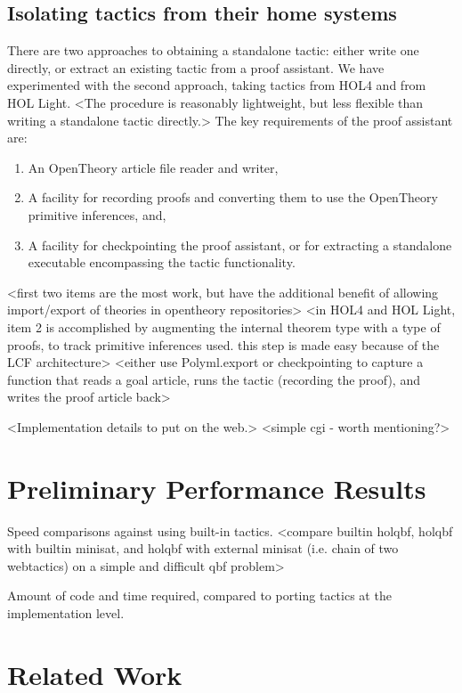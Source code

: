 \documentclass{llncs}
\newcommand{\OpenTheory}{OpenTheory\xspace}
\begin{document}
\subsection{Isolating tactics from their home systems}
There are two approaches to obtaining a standalone tactic: either write one directly, or extract an existing tactic from a proof assistant. 
We have experimented with the second approach, taking tactics from HOL4 and from HOL Light.
<The procedure is reasonably lightweight, but less flexible than writing a standalone tactic directly.>
The key requirements of the proof assistant are:
\begin{enumerate}
\item
An \OpenTheory article file reader and writer,
\item
A facility for recording proofs and converting them to use the \OpenTheory primitive inferences, and,
\item
A facility for checkpointing the proof assistant, or for extracting a standalone executable encompassing the tactic functionality.
\end{enumerate}
<first two items are the most work, but have the additional benefit of allowing import/export of theories in opentheory repositories>
<in HOL4 and HOL Light, item 2 is accomplished by augmenting the internal theorem type with a type of proofs, to track primitive inferences used. this step is made easy because of the LCF architecture>
<either use Polyml.export or checkpointing to capture a function that reads a goal article, runs the tactic (recording the proof), and writes the proof article back>

<Implementation details to put on the web.>
<simple cgi - worth mentioning?>

\section{Preliminary Performance Results}
\label{sec:performance}

Speed comparisons against using built-in tactics.
<compare builtin holqbf, holqbf with builtin minisat, and holqbf with external minisat (i.e. chain of two webtactics) on a simple and difficult qbf problem>

Amount of code and time required, compared to porting tactics at the implementation level.

\section{Related Work}
\end{document}
